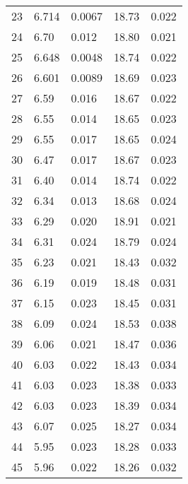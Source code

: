 \begin{table}
\begin{tabular}{c|ll|ll}
23 & 6.714 & 0.0067 & 18.73 & 0.022 \\
24 & 6.70 & 0.012 & 18.80 & 0.021 \\
25 & 6.648 & 0.0048 & 18.74 & 0.022 \\
26 & 6.601 & 0.0089 & 18.69 & 0.023 \\
27 & 6.59 & 0.016 & 18.67 & 0.022 \\
28 & 6.55 & 0.014 & 18.65 & 0.023 \\
29 & 6.55 & 0.017 & 18.65 & 0.024 \\
30 & 6.47 & 0.017 & 18.67 & 0.023 \\
31 & 6.40 & 0.014 & 18.74 & 0.022 \\
32 & 6.34 & 0.013 & 18.68 & 0.024 \\
33 & 6.29 & 0.020 & 18.91 & 0.021 \\
34 & 6.31 & 0.024 & 18.79 & 0.024 \\
35 & 6.23 & 0.021 & 18.43 & 0.032 \\
36 & 6.19 & 0.019 & 18.48 & 0.031 \\
37 & 6.15 & 0.023 & 18.45 & 0.031 \\
38 & 6.09 & 0.024 & 18.53 & 0.038 \\
39 & 6.06 & 0.021 & 18.47 & 0.036 \\
40 & 6.03 & 0.022 & 18.43 & 0.034 \\
41 & 6.03 & 0.023 & 18.38 & 0.033 \\
42 & 6.03 & 0.023 & 18.39 & 0.034 \\
43 & 6.07 & 0.025 & 18.27 & 0.034 \\
44 & 5.95 & 0.023 & 18.28 & 0.033 \\
45 & 5.96 & 0.022 & 18.26 & 0.032 \\
               \hline
        \end{tabular}
    \end{table}
    \clearpage

